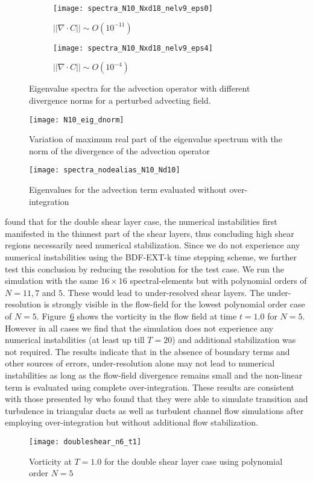 \begin{figure}[h]
	\centering
	\begin{subfigure}[b]{0.49\textwidth}
		\centering
		\texttt{[image: spectra\_N10\_Nxd18\_nelv9\_eps0]}
		\caption{$||\nabla\cdot C|| \sim O(10^{-11})$}
		\label{fig:spectra_eps0}
	\end{subfigure}
	\begin{subfigure}[b]{0.49\textwidth}
		\centering
		\texttt{[image: spectra\_N10\_Nxd18\_nelv9\_eps4]}		
		\caption{$||\nabla\cdot C|| \sim O(10^{-4})$}
		\label{fig:spectra_eps-4}
	\end{subfigure}
	\caption{Eigenvalue spectra for the advection operator with different divergence norms for a perturbed advecting field.}
	\label{fig:convection_spectra}
\end{figure}
\begin{figure}[h]
	\centerline{\texttt{[image: N10\_eig\_dnorm]}}
	\caption{\small{Variation of maximum real part of the eigenvalue spectrum with the norm of the divergence of the advection operator}}
	\label{fig:lambda_dnorm}
\end{figure}
\begin{figure}[h]
	\centerline{\texttt{[image: spectra\_nodealias\_N10\_Nd10]}}
	\caption{\small{Eigenvalues for the advection term evaluated without over-integration}}
	\label{fig:spectra_nodealias}
\end{figure}
\cite{malm13} found that for the double shear layer case, the numerical instabilities first manifested in the thinnest part of the shear layers, thus concluding high shear regions necessarily need numerical stabilization. Since we do not experience any numerical instabilities using the BDF-EXT-k time stepping scheme, we further test this conclusion by reducing the resolution for the test case. We run the simulation with the same $16\times16$ spectral-elements but with polynomial orders of $N=11,7$ and $5$. These would lead to under-resolved shear layers. The under-resolution is strongly visible in the flow-field for the lowest polynomial order case of $N=5$. Figure~\ref{fig:vorticity_n6_t1} shows the vorticity in the flow field at time $t=1.0$ for $N=5$. However in all cases we find that the simulation does not experience any numerical instabilities (at least up till $T=20$) and additional stabilization was not required. The results indicate that in the absence of boundary terms and other sources of errors, under-resolution alone may not lead to numerical instabilities as long as the flow-field divergence remains small and the non-linear term is evaluated using complete over-integration. These results are consistent with those presented by \cite{kirby03} who found that they were able to simulate transition and turbulence in triangular ducts as well as turbulent channel flow simulations after employing over-integration but without additional flow stabilization.
\begin{figure}[h]
	\centering
	\texttt{[image: doubleshear\_n6\_t1]}
	\caption{\small{Vorticity at $T=1.0$ for the double shear layer case using polynomial order $N=5$}}
	\label{fig:vorticity_n6_t1}
\end{figure}


